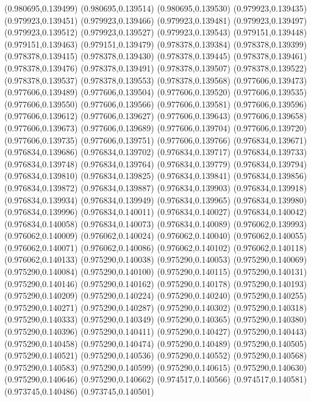 (0.980695,0.139499)
(0.980695,0.139514)
(0.980695,0.139530)
(0.979923,0.139435)
(0.979923,0.139451)
(0.979923,0.139466)
(0.979923,0.139481)
(0.979923,0.139497)
(0.979923,0.139512)
(0.979923,0.139527)
(0.979923,0.139543)
(0.979151,0.139448)
(0.979151,0.139463)
(0.979151,0.139479)
(0.978378,0.139384)
(0.978378,0.139399)
(0.978378,0.139415)
(0.978378,0.139430)
(0.978378,0.139445)
(0.978378,0.139461)
(0.978378,0.139476)
(0.978378,0.139491)
(0.978378,0.139507)
(0.978378,0.139522)
(0.978378,0.139537)
(0.978378,0.139553)
(0.978378,0.139568)
(0.977606,0.139473)
(0.977606,0.139489)
(0.977606,0.139504)
(0.977606,0.139520)
(0.977606,0.139535)
(0.977606,0.139550)
(0.977606,0.139566)
(0.977606,0.139581)
(0.977606,0.139596)
(0.977606,0.139612)
(0.977606,0.139627)
(0.977606,0.139643)
(0.977606,0.139658)
(0.977606,0.139673)
(0.977606,0.139689)
(0.977606,0.139704)
(0.977606,0.139720)
(0.977606,0.139735)
(0.977606,0.139751)
(0.977606,0.139766)
(0.976834,0.139671)
(0.976834,0.139686)
(0.976834,0.139702)
(0.976834,0.139717)
(0.976834,0.139733)
(0.976834,0.139748)
(0.976834,0.139764)
(0.976834,0.139779)
(0.976834,0.139794)
(0.976834,0.139810)
(0.976834,0.139825)
(0.976834,0.139841)
(0.976834,0.139856)
(0.976834,0.139872)
(0.976834,0.139887)
(0.976834,0.139903)
(0.976834,0.139918)
(0.976834,0.139934)
(0.976834,0.139949)
(0.976834,0.139965)
(0.976834,0.139980)
(0.976834,0.139996)
(0.976834,0.140011)
(0.976834,0.140027)
(0.976834,0.140042)
(0.976834,0.140058)
(0.976834,0.140073)
(0.976834,0.140089)
(0.976062,0.139993)
(0.976062,0.140009)
(0.976062,0.140024)
(0.976062,0.140040)
(0.976062,0.140055)
(0.976062,0.140071)
(0.976062,0.140086)
(0.976062,0.140102)
(0.976062,0.140118)
(0.976062,0.140133)
(0.975290,0.140038)
(0.975290,0.140053)
(0.975290,0.140069)
(0.975290,0.140084)
(0.975290,0.140100)
(0.975290,0.140115)
(0.975290,0.140131)
(0.975290,0.140146)
(0.975290,0.140162)
(0.975290,0.140178)
(0.975290,0.140193)
(0.975290,0.140209)
(0.975290,0.140224)
(0.975290,0.140240)
(0.975290,0.140255)
(0.975290,0.140271)
(0.975290,0.140287)
(0.975290,0.140302)
(0.975290,0.140318)
(0.975290,0.140333)
(0.975290,0.140349)
(0.975290,0.140365)
(0.975290,0.140380)
(0.975290,0.140396)
(0.975290,0.140411)
(0.975290,0.140427)
(0.975290,0.140443)
(0.975290,0.140458)
(0.975290,0.140474)
(0.975290,0.140489)
(0.975290,0.140505)
(0.975290,0.140521)
(0.975290,0.140536)
(0.975290,0.140552)
(0.975290,0.140568)
(0.975290,0.140583)
(0.975290,0.140599)
(0.975290,0.140615)
(0.975290,0.140630)
(0.975290,0.140646)
(0.975290,0.140662)
(0.974517,0.140566)
(0.974517,0.140581)
(0.973745,0.140486)
(0.973745,0.140501)
